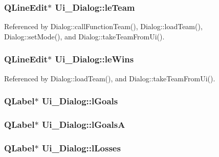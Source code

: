 \subsubsection[{le\+Team}]{\setlength{\rightskip}{0pt plus 5cm}Q\+Line\+Edit$\ast$ Ui\+\_\+\+Dialog\+::le\+Team}\label{class_ui___dialog_a3be40225f286cfb11e01a180ed40e1fc}


Referenced by Dialog\+::call\+Function\+Team(), Dialog\+::load\+Team(), Dialog\+::set\+Mode(), and Dialog\+::take\+Team\+From\+Ui().

\hypertarget{class_ui___dialog_a7f3b4fab638a423dd8f2c04842fb7b8b}{}
\subsubsection[{le\+Wins}]{\setlength{\rightskip}{0pt plus 5cm}Q\+Line\+Edit$\ast$ Ui\+\_\+\+Dialog\+::le\+Wins}\label{class_ui___dialog_a7f3b4fab638a423dd8f2c04842fb7b8b}


Referenced by Dialog\+::load\+Team(), and Dialog\+::take\+Team\+From\+Ui().

\hypertarget{class_ui___dialog_aaec0030aedf724c298c9ae002df6b9c5}{}
\subsubsection[{l\+Goals}]{\setlength{\rightskip}{0pt plus 5cm}Q\+Label$\ast$ Ui\+\_\+\+Dialog\+::l\+Goals}\label{class_ui___dialog_aaec0030aedf724c298c9ae002df6b9c5}
\hypertarget{class_ui___dialog_afb796c00602fbfb12d969d217dbd9d26}{}
\subsubsection[{l\+Goals\+A}]{\setlength{\rightskip}{0pt plus 5cm}Q\+Label$\ast$ Ui\+\_\+\+Dialog\+::l\+Goals\+A}\label{class_ui___dialog_afb796c00602fbfb12d969d217dbd9d26}
\hypertarget{class_ui___dialog_a3562c3fc6bcff7beb1d9bf6302760f87}{}
\subsubsection[{l\+Losses}]{\setlength{\rightskip}{0pt plus 5cm}Q\+Label$\ast$ Ui\+\_\+\+Dialog\+::l\+Losses}\label{class_ui___dialog_a3562c3fc6bcff7beb1d9bf6302760f87}
\hypertarget{class_ui___dialog_a4419be090ba293f0442cce11fefde939}{}
